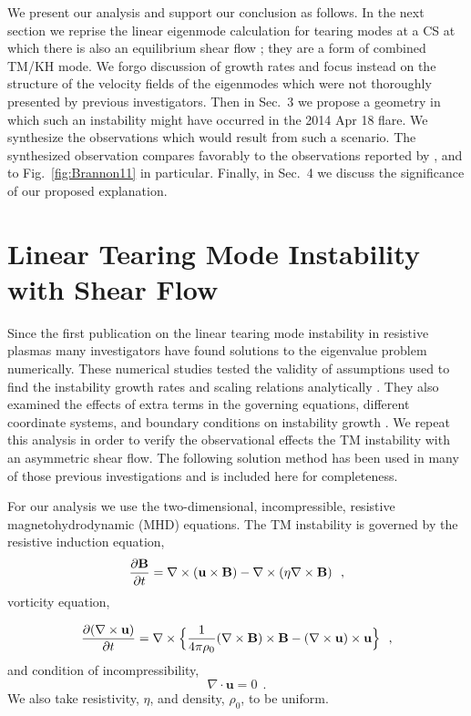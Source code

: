 We present our analysis and support our conclusion as follows.  In the next section we reprise the linear eigenmode calculation  for tearing modes at a CS at which there is also an equilibrium  shear flow \citep{Einaudi1986,Ofman1991}; they are a form of combined TM/KH mode.   We forgo discussion of growth rates and focus instead on the structure of the velocity fields of the eigenmodes which were not thoroughly presented by previous investigators.  Then in Sec.\ 3 we propose a geometry in which such an instability might have occurred in the 2014 Apr 18 flare.  We synthesize the observations which would result from such a scenario.  The synthesized observation compares favorably to the observations reported by \BLQ, and to Fig.\ \ref{fig:Brannon11} in particular.  Finally, in Sec.\ 4 we discuss the significance of our proposed explanation.

\section{Linear Tearing Mode Instability with Shear Flow}

	
	Since the first publication on the linear tearing mode instability in resistive plasmas \citep[FKR]{Furth1963} many investigators have found solutions to the eigenvalue problem numerically.  These numerical studies tested the validity of assumptions used to find the instability growth rates and scaling relations analytically \citep{Steinolfson1983}. They also examined the effects of extra terms in the governing equations, different coordinate systems, and boundary conditions on instability growth \citep{Velli1989,Ofman1991}. We repeat this analysis in order to verify the observational effects the TM instability with an asymmetric shear flow.  The following solution method has been used in many of those previous investigations \citep{Killeen1970,Steinolfson1983,Ofman1991} and is included here for completeness.
	
		
	For our analysis we use the two-dimensional, incompressible, resistive magnetohydrodynamic (MHD) equations.  The TM instability is governed by the resistive induction equation,  
	\begin{equation}
		\frac{\partial\mathbf{B}}{\partial t}  = \nabla \times (\mathbf{u} \times \mathbf{B}) - \nabla \times (\eta \nabla \times \mathbf{B})~~,
	\end{equation}	
vorticity equation,
	
	\begin{equation}
		\frac{\partial (\nabla \times \mathbf{u})}{\partial t}
		 = \nabla \times\Bigl\lbrace \frac{1}{4 \pi \rho_0} (\nabla \times \mathbf{B}) \times \mathbf{B} - (\nabla \times \mathbf{u}) \times \mathbf{u} \Bigr\rbrace~~, 
	\end{equation} 
and condition of incompressibility, 
	\begin{equation}
		\nabla \cdot \mathbf{u} = 0~~.
	\end{equation}
We also take resistivity, $\eta$, and density, $\rho_0$, to be uniform.
	
